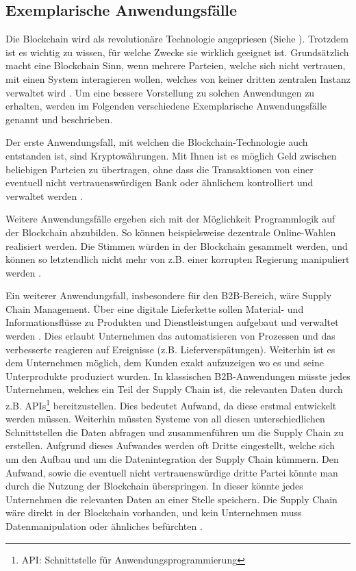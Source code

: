 \subsection{Exemplarische Anwendungsfälle}
\label{subsec:use-cases}
Die Blockchain wird als revolutionäre Technologie angepriesen (Siehe \cite{TapscottBlockchainRevolutionWieTechnologie2016}). Trotzdem ist es wichtig zu wissen, für welche Zwecke sie wirklich geeignet ist. Grundsätzlich macht eine Blockchain Sinn, wenn mehrere Parteien, welche sich nicht vertrauen, mit einen System interagieren wollen, welches von keiner dritten zentralen Instanz verwaltet wird \cite{WustyouneedBlockchain2017}. Um eine bessere Vorstellung zu solchen Anwendungen zu erhalten, werden im Folgenden verschiedene Exemplarische Anwendungsfälle genannt und beschrieben.

Der erste Anwendungsfall, mit welchen die Blockchain-Technologie auch entstanden ist, sind Kryptowährungen. Mit Ihnen ist es möglich Geld zwischen beliebigen Parteien zu übertragen, ohne dass die Transaktionen von einer eventuell nicht vertrauenswürdigen Bank oder ähnlichem kontrolliert und verwaltet werden \cite{SwanBlockchainblueprintnew2015}.

Weitere Anwendungsfälle ergeben sich mit der Möglichkeit Programmlogik auf der Blockchain abzubilden. So können beispielsweise dezentrale Online-Wahlen realisiert werden. Die Stimmen würden in der Blockchain gesammelt werden, und können so letztendlich nicht mehr von z.B. einer korrupten Regierung manipuliert werden \cite{CastorEthereumVotingScheme2017}. 

Ein weiterer Anwendungsfall, insbesondere für den B2B-Bereich, wäre Supply Chain Management. Über eine digitale Lieferkette sollen Material- und Informationsflüsse zu Produkten und Dienstleistungen aufgebaut und verwaltet werden \cite{KriegerSupplyChainManagement}. Dies erlaubt Unternehmen das automatisieren von Prozessen und das verbesserte reagieren auf Ereignisse (z.B. Lieferverspätungen). Weiterhin ist es dem Unternehmen möglich, dem Kunden exakt aufzuzeigen wo es und seine Unterprodukte produziert wurden. In klassischen B2B-Anwendungen müsste jedes Unternehmen, welches ein Teil der Supply Chain ist, die relevanten Daten durch z.B. APIs\footnote{API: Schnittstelle für Anwendungsprogrammierung\cite{DigHowAPIsevolve2006}} bereitzustellen. Dies bedeutet Aufwand, da diese erstmal entwickelt werden müssen. Weiterhin müssten Systeme von all diesen unterschiedlichen Schnittstellen die Daten abfragen und zusammenführen um die Supply Chain zu erstellen. Aufgrund dieses Aufwandes werden oft Dritte eingestellt, welche sich um den Aufbau und um die Datenintegration der Supply Chain kümmern. Den Aufwand, sowie die eventuell nicht vertrauenswürdige dritte Partei könnte man durch die Nutzung der Blockchain überspringen. In dieser könnte jedes Unternehmen die relevanten Daten an einer Stelle speichern. Die Supply Chain wäre direkt in der Blockchain vorhanden, und kein Unternehmen muss Datenmanipulation oder ähnliches befürchten \cite{KorpelaDigitalSupplyChain2017}.

